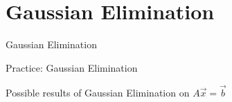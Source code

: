 \section{Gaussian Elimination}

\begin{frame}{Gaussian Elimination}

\end{frame}


\begin{frame}{Practice: Gaussian Elimination}

\end{frame}

\begin{frame}{Possible results of Gaussian Elimination on $A\vec{x} = \vec{b}$}

\end{frame}